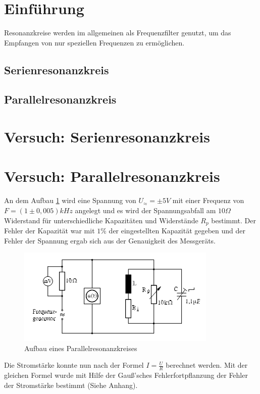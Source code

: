 \section{Einführung}
Resonanzkreise werden im allgemeinen als Frequenzfilter genutzt, um das Empfangen von nur speziellen Frequenzen zu ermöglichen.
\subsection{Serienresonanzkreis}
\subsection{Parallelresonanzkreis}
\section{Versuch: Serienresonanzkreis}
\section{Versuch: Parallelresonanzkreis}
An dem Aufbau \ref{fig:aufbauparallel} wird eine Spannung von $U_\approx=\pm 5V$ mit einer Frequenz von $F=(1 \pm 0,005) kHz$ angelegt und es wird der Spannungsabfall am $10\Omega$ Widerstand für unterschiedliche Kapazitäten und Widerstände $R_p$ bestimmt. Der Fehler der Kapazität war mit $1\% $ der eingestellten Kapazität gegeben und der Fehler der Spannung ergab sich aus der Genauigkeit des Messgeräts.
\begin{figure}[h]
  \centering
  \includegraphics[width=.9\textwidth]{Bauplanparall.png}
  \caption{Aufbau eines Parallelresonanzkreises}
  \label{fig:aufbauparallel}
\end{figure}
 Die Stromstärke konnte nun nach der Formel $I=\frac{U}{R}$ berechnet werden. Mit der gleichen Formel wurde mit Hilfe der Gauß'sches Fehlerfortpflanzung der Fehler der Stromstärke bestimmt (Siehe Anhang).
